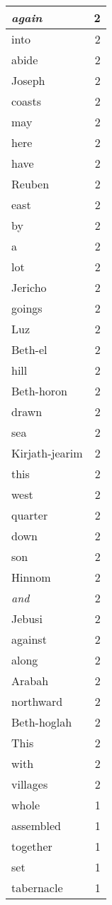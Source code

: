 \begin{center}
\begin{longtable}{l|r}
\emph{again} & 2\\ \hline 
into & 2\\ \hline 
abide & 2\\ \hline 
Joseph & 2\\ \hline 
coasts & 2\\ \hline 
may & 2\\ \hline 
here & 2\\ \hline 
have & 2\\ \hline 
Reuben & 2\\ \hline 
east & 2\\ \hline 
by & 2\\ \hline 
a & 2\\ \hline 
lot & 2\\ \hline 
Jericho & 2\\ \hline 
goings & 2\\ \hline 
Luz & 2\\ \hline 
Beth-el & 2\\ \hline 
hill & 2\\ \hline 
Beth-horon & 2\\ \hline 
drawn & 2\\ \hline 
sea & 2\\ \hline 
Kirjath-jearim & 2\\ \hline 
this & 2\\ \hline 
west & 2\\ \hline 
quarter & 2\\ \hline 
down & 2\\ \hline 
son & 2\\ \hline 
Hinnom & 2\\ \hline 
\emph{and} & 2\\ \hline 
Jebusi & 2\\ \hline 
against & 2\\ \hline 
along & 2\\ \hline 
Arabah & 2\\ \hline 
northward & 2\\ \hline 
Beth-hoglah & 2\\ \hline 
This & 2\\ \hline 
with & 2\\ \hline 
villages & 2\\ \hline 
whole & 1\\ \hline 
assembled & 1\\ \hline 
together & 1\\ \hline 
set & 1\\ \hline 
tabernacle & 1\\ \hline 

\end{longtable}
\end{center}
